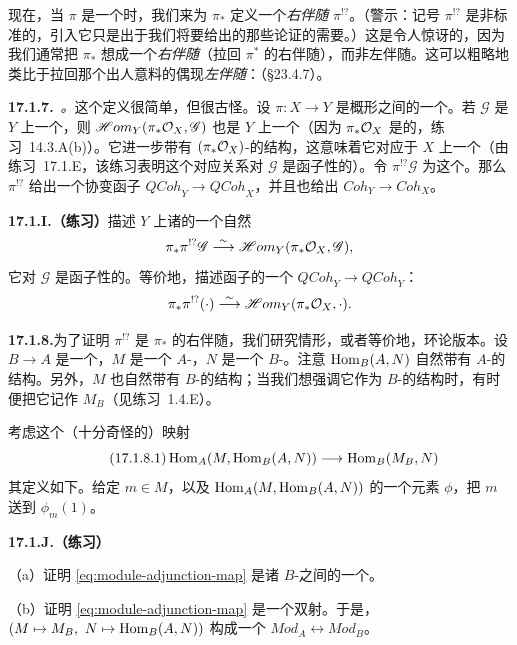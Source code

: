现在，当 $\pi$ 是一个\trFinite\trMorphism{}时，我们来为\trPushforward{} $\pi_*$ 定义一个\emph{右伴随} $\pi^{!?}$。（警示：记号 $\pi^{!?}$ 是非标准的，引入它只是出于我们将要给出的那些论证的需要。）这是令人惊讶的，因为我们通常把 $\pi_*$ 想成一个\emph{右伴随}（拉回 $\pi^*$ 的右伴随），而非左伴随。这可以粗略地类比于拉回那个出人意料的偶现\emph{左伴随}：\trExtensionByZero（\S23.4.7）。

\textbf{17.1.7.}\ \emph{\trhDefinition{}。}\quad 这个定义很简单，但很古怪。设 $\pi\colon X\to Y$ 是\trLocally\trNoetherian{}概形之间的一个\trFinite\trMorphism。若 $\mathscr{G}$ 是 $Y$ 上一个\trQCSheaf，则 $\mathscr{H}om_Y(\pi_*\mathcal{O}_X,\mathscr{G})$ 也是 $Y$ 上一个\trQCSheaf（因为 $\pi_*\mathcal{O}_X$ 是\trFinitelyPresented{}的，\mbox{练习~14.3.A(b)}）。它进一步带有 $(\pi_*\mathcal{O}_X)$-\trModule{}的结构，这意味着它对应于 $X$ 上一个\trQCSheaf（由\mbox{练习~17.1.E}，该练习表明这个对应关系对 $\mathscr{G}$ 是函子性的）。令 $\pi^{!?}\mathscr{G}$ 为这个\trQCSheaf。那么 $\pi^{!?}$ 给出一个协变函子 $\mathit{QCoh}_Y\to\mathit{QCoh}_X$，并且也给出 $\mathit{Coh}_Y\to\mathit{Coh}_X$。

\textbf{17.1.I.（练习）}\quad 描述 $Y$ 上诸\trQCSheaf{}的一个自然\trIsomorphism
\[
\pi_*\pi^{!?}\mathscr{G}\overset{\sim}{\longrightarrow}\mathscr{H}om_Y(\pi_*\mathcal{O}_X,\mathscr{G}),
\]
它对 $\mathscr{G}$ 是函子性的。等价地，描述函子的一个\trIsomorphism{} $\mathit{QCoh}_Y\to\mathit{QCoh}_Y$：
\[
\pi_*\pi^{!?}(\cdot)\overset{\sim}{\longrightarrow}\mathscr{H}om_Y(\pi_*\mathcal{O}_X,\cdot).
\]

\textbf{17.1.8.}\quad 为了证明 $\pi^{!?}$ 是 $\pi_*$ 的右伴随，我们研究\trAffine{}情形，或者等价地，环论版本。设 $B\to A$ 是一个\trRingMorphism，$M$ 是一个 $A$-\trModule，$N$ 是一个 $B$-\trModule。注意 $\operatorname{Hom}_B(A,N)$ 自然带有 $A$-\trModule{}的结构。另外，$M$ 也自然带有 $B$-\trModule{}的结构；当我们想强调它作为 $B$-\trModule{}的结构时，有时便把它记作 $M_B$（见\mbox{练习~1.4.E}）。

考虑这个（十分奇怪的）映射
\begin{equation*}\tag{17.1.8.1}\label{eq:module-adjunction-map}
\operatorname{Hom}_A(M,\operatorname{Hom}_B(A,N))\longrightarrow\operatorname{Hom}_B(M_B,N)
\end{equation*}
其定义如下。给定 $m\in M$，以及 $\operatorname{Hom}_A(M,\operatorname{Hom}_B(A,N))$ 的一个元素 $\phi$，把 $m$ 送到 $\phi_m(1)$。

\textbf{17.1.J.（练习）}

（a）证明 \eqref{eq:module-adjunction-map} 是诸 $B$-\trModule{}之间的一个\trHomomorphism。

（b）证明 \eqref{eq:module-adjunction-map} 是一个双射。于是，$(M\mapsto M_B,\ N\mapsto\Hom_B(A,N))$ 构成一个\trAdjointPair{} $\mathit{Mod}_A\leftrightarrow\mathit{Mod}_B$。

